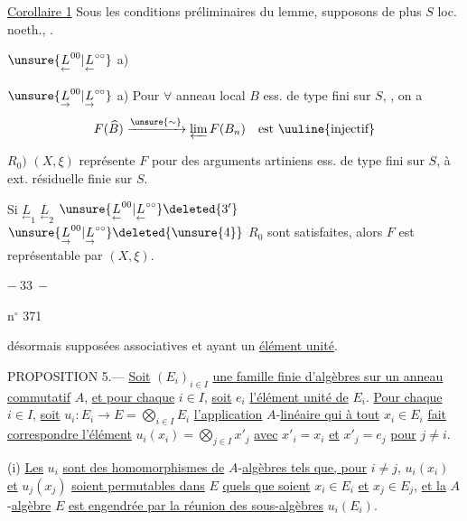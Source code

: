 \uline{Corollaire 1} Sous les conditions préliminaires du lemme, supposons de plus $S$ loc. noeth.,
 .

$\unsure{\underset{\leftarrow}{L}^{00}|\underset{\leftarrow}{L}^{\circ\circ}}$ a) 

$\unsure{\underset{\rightarrow}{L}^{00}|\underset{\rightarrow}{L}^{\circ\circ}}$ a)  Pour $\forall$ anneau local $B$ ess. de type fini sur $S$, , on a
\[
F(\widehat B)\xrightarrow{\unsure{\sim}}\varprojlim F(B_n)\quad\text{est \uuline{injectif}}
\]

$R_0)$ $(X,\xi)$ représente $F$ pour des arguments artiniens ess. de type fini sur $S$, à ext. résiduelle finie sur $S$.

Si $\underset{\leftarrow}{L}_1$ $\underset{\leftarrow}{L}_2$ $\unsure{\underset{\leftarrow}{L}^{00}|\underset{\leftarrow}{L}^{\circ\circ}}\deleted{3'}$ $\unsure{\underset{\rightarrow}{L}^{00}|\underset{\rightarrow}{L}^{\circ\circ}}\deleted{\unsure{4}}$ $R_0$ sont satisfaites, alors $F$ est représentable par $(X,\xi)$.
\begin{center}$-\ 33\ -$\end{center}
\hfill n$^\circ$ 371

désormais supposées associatives et ayant un \uline{élément unité}.

PROPOSITION 5.--- \uline{Soit} $(E_i)_{i\in I}$ \uline{une famille finie d'algèbres sur un anneau commutatif} $A$, \uline{et pour chaque} $i\in I$, \uline{soit} $e_i$ \uline{l'élément unité de} $E_i$. \uline{Pour chaque} $i\in I$, \uline{soit} $u_i:E_i\to E=\bigotimes_{i\in I}E_i$ \uline{l'application} $A$-\uline{linéaire qui à tout} $x_i\in E_i$ \uline{fait correspondre l'élément} $u_i(x_i)=\bigotimes_{j\in I}x'_j$ \uline{avec} $x'_i=x_i$ \uline{et} $x'_j=e_j$ \uline{pour} $j\ne i$.

(i) \uline{Les} $u_i$ \uline{sont des homomorphismes de} $A$-\uline{algèbres tels que, pour} $i\ne j$, $u_i(x_i)$ \uline{et} $u_j(x_j)$ \uline{soient permutables dans} $E$ \uline{quels que soient} $x_i\in E_i$ \uline{et} $x_j\in E_j$, \uline{et la} $A$-\uline{algèbre} $E$ \uline{est engendrée par la réunion des sous-algèbres} $u_i(E_i)$.

